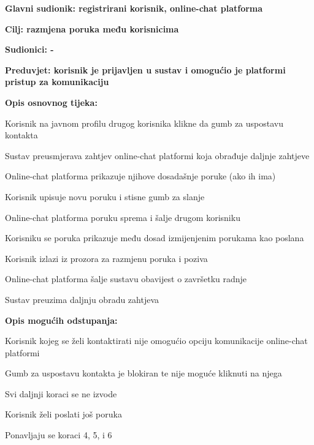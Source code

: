 					\noindent {}
					\begin{packed_item}
						\item \textbf{Glavni sudionik: registrirani korisnik, online-chat platforma}
						\item  \textbf{Cilj: razmjena poruka među korisnicima}
						\item  \textbf{Sudionici: -}
						\item  \textbf{Preduvjet: korisnik je prijavljen u sustav i omogućio je platformi pristup za komunikaciju}
						
						\item  \textbf{Opis osnovnog tijeka:}
						\item[] \begin{packed_enum}
							\item Korisnik na javnom profilu drugog korisnika klikne da gumb za uspostavu kontakta
							\item Sustav preusmjerava zahtjev online-chat platformi koja obrađuje daljnje zahtjeve
							\item Online-chat platforma prikazuje njihove dosadašnje poruke (ako ih ima)
							\item Korisnik upisuje novu poruku i stisne gumb za slanje
							\item Online-chat platforma poruku sprema i šalje drugom korisniku
							\item Korisniku se poruka prikazuje među dosad izmijenjenim porukama kao poslana
							\item Korisnik izlazi iz prozora za razmjenu poruka i poziva
							\item Online-chat platforma šalje sustavu obavijest o završetku radnje
							\item Sustav preuzima daljnju obradu zahtjeva
						\end{packed_enum}
						
						\item  \textbf{Opis mogućih odstupanja:}
							\begin{packed_item}
								\item[1.a] Korisnik kojeg se želi kontaktirati nije omogućio opciju komunikacije online-chat platformi
								\begin{packed_enum}
									\item Gumb za uspostavu kontakta je blokiran te nije moguće kliknuti na njega
									\item Svi daljnji koraci se ne izvode
								\end{packed_enum}
								\item[7.a] Korisnik želi poslati još poruka
								\begin{packed_enum}
									\item Ponavljaju se koraci 4, 5, i 6
								\end{packed_enum}
							\end{packed_item}
					\end{packed_item}
				



